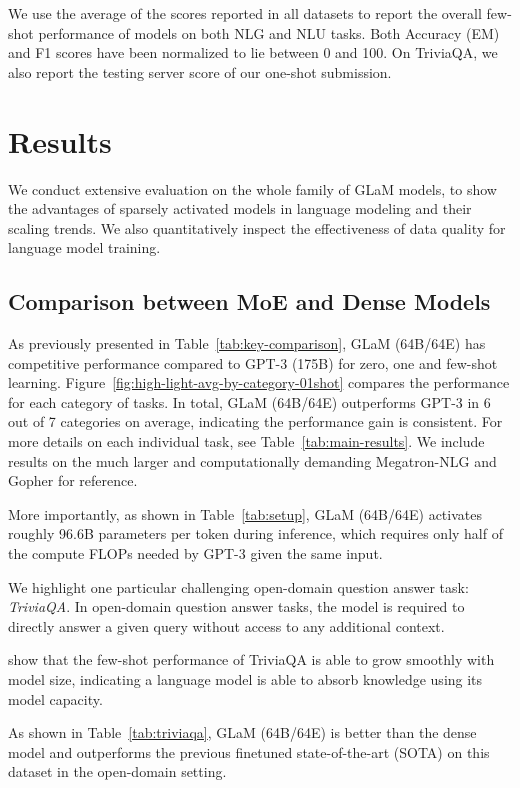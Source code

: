We use the average of the scores reported in all datasets to report the overall few-shot performance of models on both NLG and NLU tasks.  Both Accuracy (EM) and F1 scores have been normalized to lie between 0 and 100. On TriviaQA, we also report the testing server score of our one-shot submission. 

\section{Results}

We conduct extensive evaluation on the whole family of GLaM models, to show the advantages of sparsely activated models in language modeling and their scaling trends. We also quantitatively inspect the effectiveness of data quality for language model training.

\subsection{Comparison between MoE and Dense Models}\label{sec:moe_vs_dense}
As previously presented in Table~\ref{tab:key-comparison}, GLaM (64B/64E) has competitive performance compared to GPT-3 (175B) for zero, one and few-shot learning. Figure~\ref{fig:high-light-avg-by-category-01shot} compares the performance for each category of tasks. In total, GLaM (64B/64E) outperforms GPT-3 in 6 out of 7 categories on average, indicating the performance gain is consistent. For more details on each individual task, see Table~\ref{tab:main-results}. We include results on the much larger and computationally demanding Megatron-NLG and Gopher for reference.

More importantly, as shown in Table~\ref{tab:setup}, GLaM (64B/64E) activates roughly 96.6B parameters per token during inference, which requires only half of the compute FLOPs needed by GPT-3 given the same input.

We highlight one particular challenging open-domain question answer task: \emph{TriviaQA}. In open-domain question answer tasks, the model is required to directly answer a given query without access to any additional context.

\citet{NEURIPS2020_gpt3} show that the few-shot performance of TriviaQA is able to grow smoothly with model size, indicating a language model is able to absorb knowledge using its model capacity.

As shown in Table~\ref{tab:triviaqa}, GLaM (64B/64E) is better than the dense model and outperforms the previous finetuned state-of-the-art (SOTA) on this dataset in the open-domain setting. 

